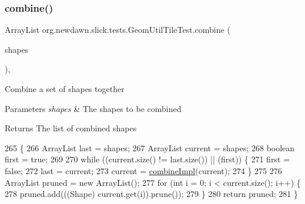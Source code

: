 \subsubsection{\texorpdfstring{combine()}{combine()}}
{\footnotesize\ttfamily Array\+List org.\+newdawn.\+slick.\+tests.\+Geom\+Util\+Tile\+Test.\+combine (\begin{DoxyParamCaption}\item[{Array\+List}]{shapes }\end{DoxyParamCaption})\hspace{0.3cm}{\ttfamily [inline]}, {\ttfamily [private]}}

Combine a set of shapes together


\begin{DoxyParams}{Parameters}
{\em shapes} & The shapes to be combined \\
\hline
\end{DoxyParams}
\begin{DoxyReturn}{Returns}
The list of combined shapes 
\end{DoxyReturn}

\begin{DoxyCode}
265                                                 \{
266         ArrayList last = shapes;
267         ArrayList current = shapes;
268         \textcolor{keywordtype}{boolean} first = \textcolor{keyword}{true};
269 
270         \textcolor{keywordflow}{while} ((current.size() != last.size()) || (first)) \{
271             first = \textcolor{keyword}{false};
272             last = current;
273             current = \mbox{\hyperlink{classorg_1_1newdawn_1_1slick_1_1tests_1_1_geom_util_tile_test_afce35caf51d06168a46f817753b326a8}{combineImpl}}(current);
274         \}
275 
276         ArrayList pruned = \textcolor{keyword}{new} ArrayList();
277         \textcolor{keywordflow}{for} (\textcolor{keywordtype}{int} i = 0; i < current.size(); i++) \{
278             pruned.add(((Shape) current.get(i)).prune());
279         \}
280         \textcolor{keywordflow}{return} pruned;
281     \}
\end{DoxyCode}
\mbox{\label{classorg_1_1newdawn_1_1slick_1_1tests_1_1_geom_util_tile_test_afce35caf51d06168a46f817753b326a8}} 
